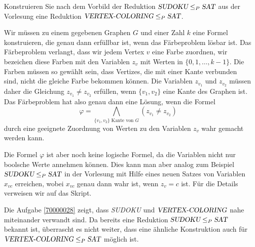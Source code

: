 Konstruieren Sie nach dem Vorbild der Reduktion
$\textsl{SUDOKU}\le_P\textsl{SAT}$ aus der Vorlesung eine
Reduktion
$\textsl{VERTEX-COLORING}\le_P\textsl{SAT}$.


\begin{loesung}
Wir müssen zu einem gegebenen Graphen $G$ und einer Zahl $k$ eine
Formel konstruieren, die genau dann erfüllbar ist, wenn das Färbeproblem
lösbar ist. Das Färbeproblem verlangt, dass wir jedem Vertex $v$ eine
Farbe zuordnen, wir bezeichen diese Farben mit den Variablen $z_v$
mit Werten in $\{0,1,\dots,k-1\}$.
Die Farben müssen so gewählt sein, dass Vertizes, die mit einer Kante
verbunden sind, nicht die gleiche Farbe bekommen können. Die Variablen
$z_{v_1}$ und $z_{v_2}$ müssen daher die Gleichung $z_{v_1}\ne z_{v_2}$
erfüllen, wenn $\{v_1,v_2\}$ eine Kante des Graphen ist. Das Färbeproblem
hat also genau dann eine Lösung, wenn die Formel
\[
\varphi =\bigwedge_{\text{$\{v_1,v_2\}$ Kante von $G$}} (z_{v_1}\ne z_{v_2})
\]
durch eine geeignete Zuordnung von Werten zu den Variablen $z_v$ wahr gemacht
werden kann.

Die Formel $\varphi$ ist aber noch keine logische Formel, da die Variablen
nicht nur boolsche Werte annehmen können.
Dies kann man aber analog zum Beispiel $\textsl{SUDOKU}\le_P\textsl{SAT}$
in der Vorlesung mit Hilfe eines neuen Satzes von Variablen $x_{vc}$
erreichen, wobei $x_{vc}$ genau dann wahr ist, wenn $z_v=c$ ist.
Für die Details verweisen wir auf das Skript.
\end{loesung}

\begin{diskussion}
Die Aufgabe \ref{70000028} zeigt, dass \textsl{SUDOKU} und 
$\textsl{VERTEX-COLORING}$ nahe miteinander verwandt sind.
Da bereits eine Reduktion $\textsl{SUDOKU}\le_P\textsl{SAT}$
bekannt ist, überrascht es nicht weiter, dass eine ähnliche
Konstruktion auch für
$\textsl{VERTEX-COLORING}\le_P\textsl{SAT}$
möglich ist.
\end{diskussion}


